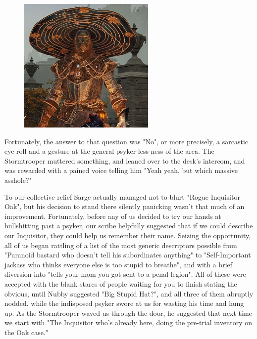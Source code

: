 \begin{figure}
	\begin{center}
		\includegraphics[width=\figwidth]{pics/21/72.png}
	\end{center}
\end{figure}
Fortunately, the answer to that question was "No", or more precisely, a sarcastic eye roll and a gesture at the general psyker-less-ness of the area. 
The Stormtrooper muttered something, and leaned over to the desk's intercom, and was rewarded with a pained voice telling him "Yeah yeah, but which massive asshole?"

To our collective relief Sarge actually managed not to blurt "Rogue Inquisitor Oak", but his decision to stand there silently panicking wasn't that much of an improvement. 
Fortunately, before any of us decided to try our hands at bullshitting past a psyker, our scribe helpfully suggested that if we could describe our Inquisitor, they could help us remember their name. 
Seizing the opportunity, all of us began rattling of a list of the most generic descriptors possible from "Paranoid bastard who doesn't tell his subordinates anything" to "Self-Important jackass who thinks everyone else is too stupid to breathe", and with a brief diversion into "tells your mom you got sent to a penal legion". 
All of these were accepted with the blank stares of people waiting for you to finish stating the obvious, until Nubby suggested "Big Stupid Hat?", and all three of them abruptly nodded, while the indisposed psyker swore at us for wasting his time and hung up. 
As the Stormtrooper waved us through the door, he suggested that next time we start with "The Inquisitor who's already here, doing the pre-trial inventory on the Oak case."

